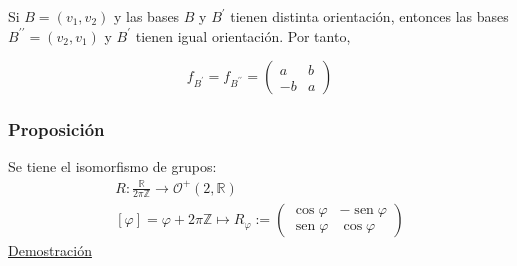 \documentclass[12pt, a4paper, ones, notitlepage, openany,titlepage]{article}
\newcommand{\demostracion}{\noindent\underline{Demostración}}
\begin{document}
Si $B=\left(v_{1}, v_{2}\right)$ y las bases $B$ y $B^{\prime}$ tienen distinta orientación, entonces las bases $B^{\prime \prime}=\left(v_{2}, v_{1}\right)$ y $B^{\prime}$ tienen igual orientación. Por tanto,

$$
f_{B^{\prime}}=f_{B^{\prime \prime}}=\left(\begin{array}{rr}
	a & b \\
	-b & a
\end{array}\right)
$$

\subsubsection{Proposición}
Se tiene el isomorfismo de grupos:
$$
\begin{gathered}
	R: \frac{\mathbb{R}}{2 \pi \mathbb{Z}} \longrightarrow \mathcal{O}^{+}(2, \mathbb{R}) \\
	[\varphi] = \varphi+2 \pi \mathbb{Z} \longmapsto R_{\varphi} := \begin{pmatrix}
		\operatorname{cos}\varphi & -\operatorname{sen}\varphi \\
		\operatorname{sen}\varphi & \operatorname{cos}\varphi
	\end{pmatrix}
\end{gathered}
$$
\demostracion
\end{document}
